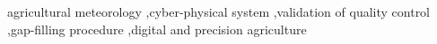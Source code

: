 \documentclass[authoryear,preprint,review,12pt]{elsarticle}
\begin{document}
\begin{frontmatter}
\begin{keyword}
agricultural meteorology \sep cyber-physical system \sep validation of quality control \sep gap-filling procedure \sep digital and precision agriculture

\end{keyword}




\end{frontmatter}
\end{document}
